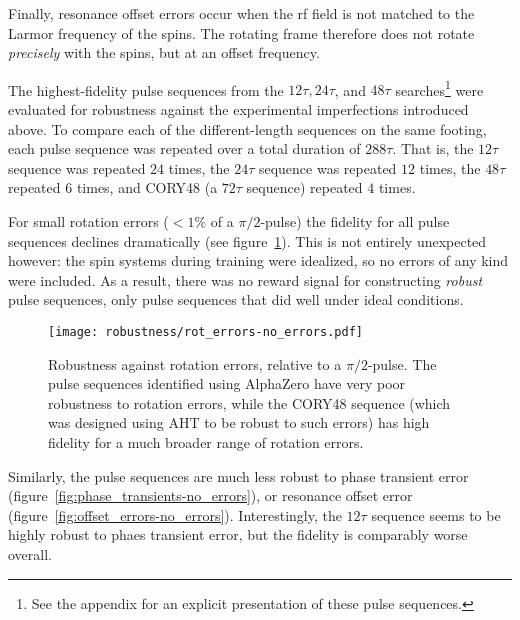 Finally, resonance offset errors occur when the rf field is not matched to the Larmor frequency of the spins. The rotating frame therefore does not rotate \emph{precisely} with the spins, but at an offset frequency.

The highest-fidelity pulse sequences from the $12\tau, 24\tau$, and $48\tau$ searches\footnote{
See the appendix for an explicit presentation of these pulse sequences.
} were evaluated for robustness against the experimental imperfections introduced above. To compare each of the different-length sequences on the same footing, each pulse sequence was repeated over a total duration of $288\tau$. That is, the $12\tau$ sequence was repeated $24$ times, the $24\tau$ sequence was repeated $12$ times, the $48\tau$ repeated $6$ times, and CORY48 (a $72\tau$ sequence) repeated $4$ times.



For small rotation errors ($<1\%$ of a $\pi/2$-pulse) the fidelity for all pulse sequences declines dramatically (see figure~\ref{fig:rot_errors-no_errors}).
This is not entirely unexpected however: the spin systems during training were idealized, so no errors of any kind were included. As a result, there was no reward signal for constructing \emph{robust} pulse sequences, only pulse sequences that did well under ideal conditions.





\begin{figure}[H]
    \centering
    \texttt{[image: robustness/rot\_errors-no\_errors.pdf]}
    \caption{Robustness against rotation errors, relative to a $\pi/2$-pulse. The pulse sequences identified using AlphaZero have very poor robustness to rotation errors, while the CORY48 sequence (which was designed using AHT to be robust to such errors) has high fidelity for a much broader range of rotation errors.
    }
    \label{fig:rot_errors-no_errors}
\end{figure}

Similarly, the pulse sequences are much less robust to phase transient error (figure~\ref{fig:phase_transients-no_errors}), or
resonance offset error (figure~\ref{fig:offset_errors-no_errors}). Interestingly, the $12\tau$ sequence seems to be highly robust to phaes transient error, but the fidelity is comparably worse overall.


